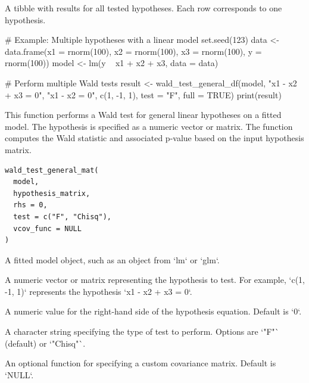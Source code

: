 \documentclass[a4paper]{book}
\begin{document}
%
\begin{Value}
A tibble with results for all tested hypotheses. Each row corresponds to one hypothesis.
\end{Value}
%
\begin{Examples}
\begin{ExampleCode}
# Example: Multiple hypotheses with a linear model
set.seed(123)
data <- data.frame(x1 = rnorm(100), x2 = rnorm(100), x3 = rnorm(100), y = rnorm(100))
model <- lm(y ~ x1 + x2 + x3, data = data)

# Perform multiple Wald tests
result <- wald_test_general_df(model, "x1 - x2 + x3 = 0", "x1 - x2 = 0", c(1, -1, 1), test = "F", full = TRUE)
print(result)

\end{ExampleCode}
\end{Examples}
%
\begin{Description}
This function performs a Wald test for general linear hypotheses on a fitted model.
The hypothesis is specified as a numeric vector or matrix. The function computes
the Wald statistic and associated p-value based on the input hypothesis matrix.
\end{Description}
%
\begin{Usage}
\begin{verbatim}
wald_test_general_mat(
  model,
  hypothesis_matrix,
  rhs = 0,
  test = c("F", "Chisq"),
  vcov_func = NULL
)
\end{verbatim}
\end{Usage}
%
\begin{Arguments}
\begin{ldescription}
\item[\code{model}] A fitted model object, such as an object from `lm` or `glm`.

\item[\code{hypothesis\_matrix}] A numeric vector or matrix representing the hypothesis to test.
For example, `c(1, -1, 1)` represents the hypothesis `x1 - x2 + x3 = 0`.

\item[\code{rhs}] A numeric value for the right-hand side of the hypothesis equation. Default is `0`.

\item[\code{test}] A character string specifying the type of test to perform. Options are `"F"`
(default) or `"Chisq"`.

\item[\code{vcov\_func}] An optional function for specifying a custom covariance matrix. Default is `NULL`.
\end{ldescription}
\end{Arguments}
\end{document}
